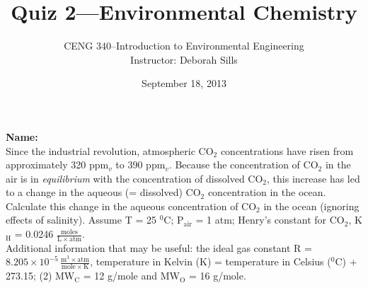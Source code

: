 \documentclass[12pt,letterpaper]{article}
\begin{document}
\setlength{\parindent}{0cm} 


\frenchspacing


\title {\Large Quiz 2---Environmental Chemistry} 
\author {CENG 340--Introduction to Environmental Engineering\\
Instructor: Deborah Sills}
\date {September 18, 2013}
\maketitle


\vspace{-0.2 in}
\textbf{Name:}\\


Since the industrial revolution, atmospheric CO$_2$ concentrations have risen from approximately 320 ppm$_v$ to 390 ppm$_v$.  Because the concentration of CO$_2$ in the air is in \emph{equilibrium} with the concentration of dissolved CO$_2$, this increase has led to a change in the aqueous (= dissolved) CO$_2$ concentration in the ocean.\\

Calculate this change in the aqueous concentration of CO$_2$ in the ocean (ignoring effects of salinity).  Assume T = 25 $^0$C; P$_{\mathrm{air}}$ = 1 atm; Henry's constant for CO$_2$, K$\mathrm{_H}$ = 0.0246 $\mathrm{\frac{moles}{L\times atm}}$.\\

Additional information that may be useful: the ideal gas constant R = $8.205\times 10^{-5}\, \mathrm{\frac{m^3 \times atm}{mole \times K}}$, temperature in Kelvin (K) = temperature in Celsius ($^0$C) + 273.15; (2) MW$\mathrm{_C}$ = 12 g/mole and MW$\mathrm{_O}$ = 16 g/mole.
\end{document}
